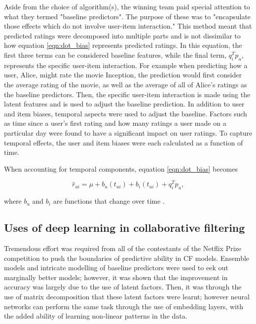 Aside from the choice of algorithm(s), the winning team paid special attention to what they termed "baseline predictors". The purpose of these was to "encapsulate those effects which do not involve user-item interaction." This method meant that predicted ratings were decomposed into multiple parts and is not dissimilar to how equation \ref{eqn:dot_bias} represents predicted ratings. In this equation, the first three terms can be considered baseline features, while the final term, $q_i^T p_u$, represents the specific user-item interaction. For example when predicting how a user, Alice, might rate the movie Inception, the prediction would first consider the average rating of the movie, as well as the average of all of Alice's ratings as the baseline predictors. Then, the specific user-item interaction is made using the latent features and is used to adjust the baseline prediction. In addition to user and item biases, temporal aspects were used to adjust the baseline. Factors such as time since a user's first rating and how many ratings a user made on a particular day were found to have a significant impact on user ratings. To capture temporal effects, the user and item biases were each calculated as a function of time. 

When accounting for temporal components, equation \ref{eqn:dot_bias} becomes

\begin{equation}
    \hat{r}_{ui} = \mu + b_u(t_{ui}) + b_i(t_{ui}) + q_i^T p_u,
\label{eqn:temp_baseline}
\end{equation}

where $b_u$ and $b_i$ are functions that change over time \parencite{netflix_bellkor}.

\subsection{Uses of deep learning in collaborative filtering}
Tremendous effort was required from all of the contestants of the Netflix Prize competition to push the boundaries of predictive ability in CF models. Ensemble models and intricate modelling of baseline predictors were used to eek out marginally better models; however, it was shown that the improvement in accuracy was largely due to the use of latent factors. Then, it was through the use of matrix decomposition that these latent factors were learnt; however neural networks can perform the same task through the use of embedding layers, with the added ability of learning non-linear patterns in the data.

